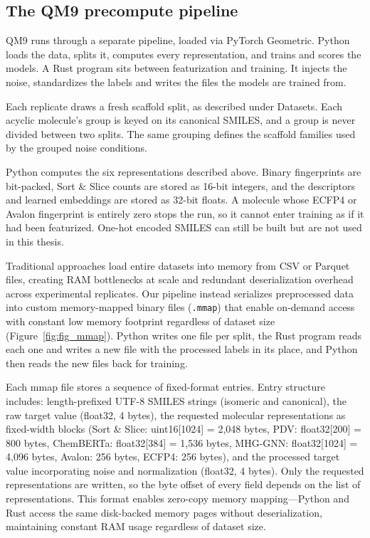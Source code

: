 \subsection{The QM9 precompute pipeline}

QM9 \citep{Ramakrishnan2014} runs through a separate pipeline, loaded via PyTorch Geometric. Python
loads the data, splits it, computes every representation, and trains and scores the models. A Rust
program sits between featurization and training. It injects the noise, standardizes the labels and
writes the files the models are trained from.

Each replicate draws a fresh scaffold split, as described under Datasets. Each acyclic molecule's
group is keyed on its canonical SMILES, and a group is never divided between two splits. The same
grouping defines the scaffold families used by the grouped noise conditions.

Python computes the six representations described above. Binary fingerprints are bit-packed, Sort \&
Slice counts are stored as 16-bit integers, and the descriptors and learned embeddings are stored
as 32-bit floats. A molecule whose ECFP4 or Avalon fingerprint is entirely zero stops the run, so it
cannot enter training as if it had been featurized. One-hot encoded SMILES can still be built but
are not used in this thesis.

Traditional approaches load entire datasets into memory from CSV or Parquet files, creating RAM bottlenecks at scale and redundant deserialization overhead across experimental replicates. Our pipeline instead serializes preprocessed data into custom memory-mapped binary files (\texttt{.mmap}) that enable on-demand access with constant low memory footprint regardless of dataset size (Figure~\ref{fig:fig_mmap}). Python writes one file per split, the Rust program reads each one and writes a new file with the processed labels in its place, and Python then reads the new files back for training.

Each mmap file stores a sequence of fixed-format entries. Entry structure includes: length-prefixed UTF-8 SMILES strings (isomeric and canonical), the raw target value (float32, 4 bytes), the requested molecular representations as fixed-width blocks (Sort \& Slice: uint16[1024] = 2,048 bytes, PDV: float32[200] = 800 bytes, ChemBERTa: float32[384] = 1,536 bytes, MHG-GNN: float32[1024] = 4,096 bytes, Avalon: 256 bytes, ECFP4: 256 bytes), and the processed target value incorporating noise and normalization (float32, 4 bytes). Only the requested representations are written, so the byte offset of every field depends on the list of representations. This format enables zero-copy memory mapping—Python and Rust access the same disk-backed memory pages without deserialization, maintaining constant RAM usage regardless of dataset size.

